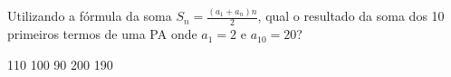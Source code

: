 Utilizando a fórmula da soma $S_n=\frac{(a_1+a_n)n}{2}$, qual o resultado da soma dos 10 primeiros termos de uma PA onde $a_1 = 2$ e $a_{10} = 20$?

110
100
90
200
190





